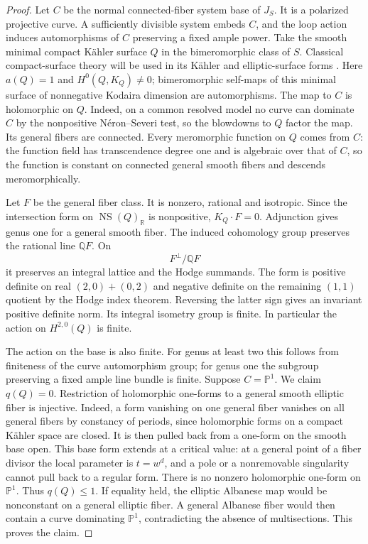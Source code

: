 \documentclass[11pt,letterpaper]{article}
\newcommand{\Q}{\mathbb{Q}}
\newcommand{\R}{\mathbb{R}}
\newcommand{\PP}{\mathbb{P}}
\DeclareMathOperator{\NS}{NS}
\theoremstyle{definition}
\theoremstyle{remark}
\begin{document}
\begin{proof}
Let $C$ be the normal connected-fiber system base of $J_S$.
It is a polarized projective curve.  A sufficiently divisible
system embeds $C$, and the loop action induces automorphisms of
$C$ preserving a fixed ample power.  Take the smooth minimal
compact K\"ahler surface $Q$ in the bimeromorphic class of $S$.
Classical compact-surface theory will be used in its K\"ahler
and elliptic-surface forms \cite{BHPV}.  Here $a(Q)=1$ and
$H^0(Q,K_Q)\ne0$; bimeromorphic self-maps of this minimal
surface of nonnegative Kodaira dimension are automorphisms.
The map to $C$ is holomorphic on $Q$.  Indeed, on a common
resolved model no curve can dominate $C$ by the nonpositive
N\'eron--Severi test, so the blowdowns to $Q$ factor the map.
Its general fibers are connected.  Every meromorphic function
on $Q$ comes from $C$: the function field has transcendence
degree one and is algebraic over that of $C$, so the function
is constant on connected general smooth fibers and descends
meromorphically.

Let $F$ be the general fiber class.  It is nonzero, rational
and isotropic.  Since the intersection form on $\NS(Q)_\R$
is nonpositive, $K_Q\cdot F=0$.  Adjunction gives genus one
for a general smooth fiber.  The induced cohomology group
preserves the rational line $\Q F$.  On
\begin{equation}
 \label{floor:isotropic-quotient}
 F^\perp/\Q F
\end{equation}
it preserves an integral lattice and the Hodge summands.  The
form is positive definite on real $(2,0)+(0,2)$ and negative
definite on the remaining $(1,1)$ quotient by the Hodge index
theorem.  Reversing the latter sign gives an invariant positive
definite norm.  Its integral isometry group is finite.  In
particular the action on $H^{2,0}(Q)$ is finite.

The action on the base is also finite.  For genus at least two
this follows from finiteness of the curve automorphism group;
for genus one the subgroup preserving a fixed ample line
bundle is finite.  Suppose $C=\PP^1$.  We claim $q(Q)=0$.
Restriction of holomorphic one-forms to a general smooth
elliptic fiber is injective.  Indeed, a form vanishing on one
general fiber vanishes on all general fibers by constancy of
periods, since holomorphic forms on a compact K\"ahler space
are closed.  It is then pulled back from a one-form on the
smooth base open.  This base form extends at a critical value:
at a general point of a fiber divisor the local parameter is
$t=w^d$, and a pole or a nonremovable singularity cannot
pull back to a regular form.  There is no nonzero holomorphic
one-form on $\PP^1$.  Thus $q(Q)\le1$.  If equality held,
the elliptic Albanese map would be nonconstant on a general
elliptic fiber.  A general Albanese fiber would then contain
a curve dominating $\PP^1$, contradicting the absence of
multisections.  This proves the claim.


\end{proof}
\end{document}
